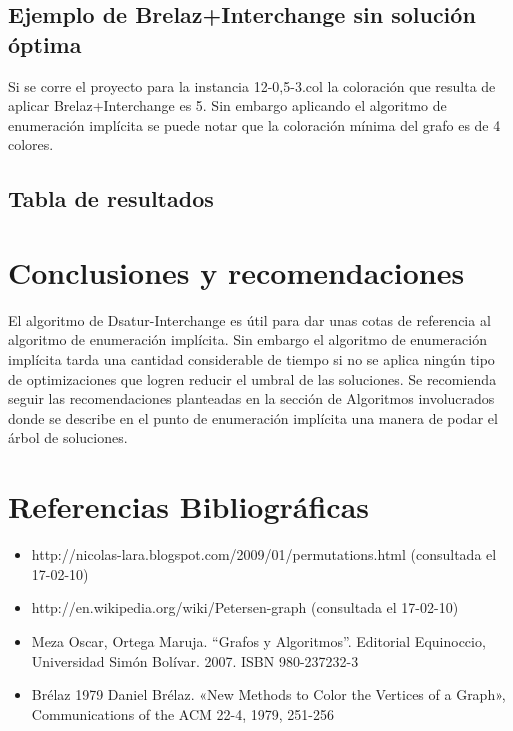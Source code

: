 \documentclass[a4paper,10pt]{article}
\begin{document}
\subsection{Ejemplo de Brelaz+Interchange sin solución óptima}
Si se corre el proyecto para la instancia 12-0,5-3.col la coloración que
resulta de aplicar Brelaz+Interchange es 5. Sin embargo aplicando el
algoritmo de enumeración implícita se puede notar que la coloración
mínima del grafo es de 4 colores.

\subsection{Tabla de resultados}
\newpage

\section{Conclusiones y recomendaciones}
El algoritmo de Dsatur-Interchange es útil para dar unas cotas de
referencia al algoritmo de enumeración implícita. Sin embargo el
algoritmo de enumeración implícita tarda una cantidad considerable de
tiempo si no se aplica ningún tipo de optimizaciones que logren reducir
el umbral de las soluciones. Se recomienda seguir las recomendaciones
planteadas en la sección de Algoritmos involucrados donde se describe en
el punto de enumeración implícita una manera de podar el árbol de
soluciones.


\section{Referencias Bibliográficas}
\begin{itemize}
 \item http://nicolas-lara.blogspot.com/2009/01/permutations.html (consultada el 17-02-10)
 \item http://en.wikipedia.org/wiki/Petersen-graph (consultada el 17-02-10)
 \item Meza Oscar, Ortega Maruja. “Grafos y Algoritmos”. Editorial Equinoccio, Universidad Simón Bolívar. 2007. ISBN 980-237232-3
 \item Brélaz 1979 Daniel Brélaz. «New Methods to Color the Vertices of a Graph», Communications of the ACM 22-4, 1979, 251-256
\end{itemize}
\end{document}
